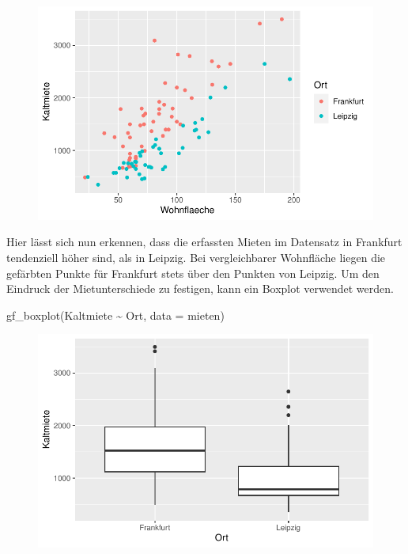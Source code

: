 \documentclass[
  a4paper,
  DIV=11]{scrartcl}
\newenvironment{Shaded}{\begin{snugshade}}{\end{snugshade}}
\newcommand{\AttributeTok}[1]{\textcolor[rgb]{0.40,0.45,0.13}{#1}}
\newcommand{\FunctionTok}[1]{\textcolor[rgb]{0.28,0.35,0.67}{#1}}
\newcommand{\NormalTok}[1]{\textcolor[rgb]{0.00,0.23,0.31}{#1}}
\newcommand{\SpecialCharTok}[1]{\textcolor[rgb]{0.37,0.37,0.37}{#1}}
\begin{document}
\begin{figure}[H]

{\centering \includegraphics{Mietmodellierung_files/figure-pdf/unnamed-chunk-7-1.pdf}

}

\end{figure}

Hier lässt sich nun erkennen, dass die erfassten Mieten im Datensatz in
Frankfurt tendenziell höher sind, als in Leipzig. Bei vergleichbarer
Wohnfläche liegen die gefärbten Punkte für Frankfurt stets über den
Punkten von Leipzig. Um den Eindruck der Mietunterschiede zu festigen,
kann ein Boxplot verwendet werden.

\begin{Shaded}
\begin{Highlighting}[]
\FunctionTok{gf\_boxplot}\NormalTok{(Kaltmiete }\SpecialCharTok{\textasciitilde{}}\NormalTok{ Ort, }\AttributeTok{data =}\NormalTok{ mieten)}
\end{Highlighting}
\end{Shaded}

\begin{figure}[H]

{\centering \includegraphics{Mietmodellierung_files/figure-pdf/unnamed-chunk-8-1.pdf}

}

\end{figure}
\end{document}
